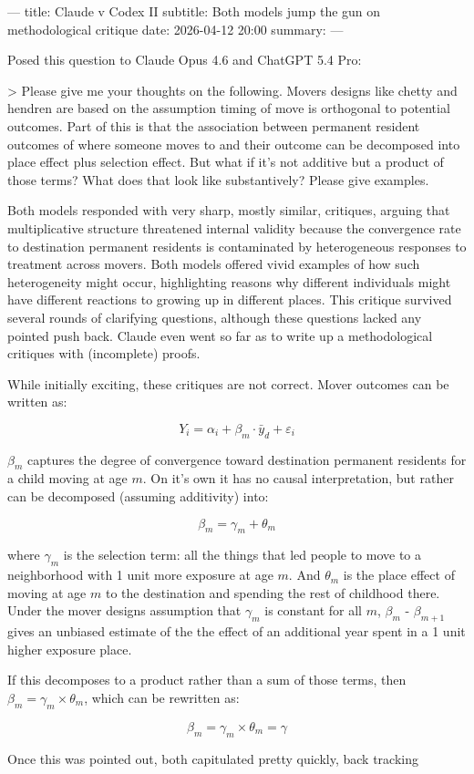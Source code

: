 ---
title: Claude v Codex II
subtitle: Both models jump the gun on methodological critique
date: 2026-04-12 20:00
summary:
---

Posed this question to Claude Opus 4.6 and ChatGPT 5.4 Pro:

> Please give me your thoughts on the following. Movers designs like chetty and hendren are based on the assumption timing of move is orthogonal to potential outcomes. Part of this is that the association between permanent resident outcomes of where someone moves to and their outcome can be decomposed into place effect plus selection effect. But what if it’s not additive but a product of those terms? What does that look like substantively? Please give examples.

Both models responded with very sharp, mostly similar, critiques, arguing that multiplicative structure threatened internal validity because the convergence rate to destination permanent residents is contaminated by heterogeneous responses to treatment across movers. Both models offered vivid examples of how such heterogeneity might occur, highlighting reasons why different individuals might have different reactions to growing up in different places. This critique survived several rounds of clarifying questions, although these questions lacked any pointed push back. Claude even went so far as to write up a methodological critiques with (incomplete) proofs. 

While initially exciting, these critiques are not correct. Mover outcomes can be written as:

$$Y_i = \alpha_i + \beta_m \cdot \bar{y}_d + \varepsilon_i$$

$\beta_m$ captures the degree of convergence toward destination permanent residents for a child moving at age $m$. On it's own it has no causal interpretation, but rather can be decomposed (assuming additivity) into:

$$\beta_m = \gamma_m + \theta_m$$

where $\gamma_m$ is the selection term: all the things that led people to move to a neighborhood with 1 unit more exposure at age $m$. And $\theta_m$ is the place effect of moving at age $m$ to the destination and spending the rest of childhood there. Under the mover designs assumption that $\gamma_m$ is constant for all $m$, $\beta_m$ - $\beta_{m+1}$ gives an unbiased estimate of the the effect of an additional year spent in a 1 unit higher exposure place. 

If this decomposes to a product rather than a sum of those terms, then $\beta_m = \gamma_m \times \theta_m$, which can be rewritten as:

$$\beta_m = \gamma_m \times \theta_m = \gamma$$

Once this was pointed out, both capitulated pretty quickly, back tracking 